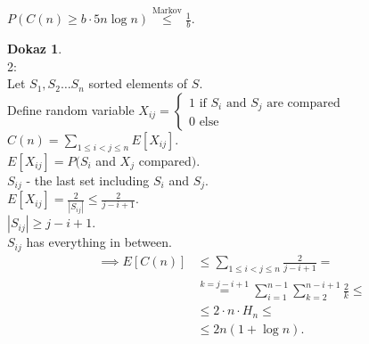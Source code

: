 \documentclass[a4paper, 12pt]{book}
\theoremstyle{definition}
\newtheorem{pro}[counter]{Dokaz}
\theoremstyle{remark}
\begin{document}
$P\left(C(n) \geq b \cdot 5n \log n\right) \stackrel{\text{Markov}}{\leq} \frac{1}{b}$.
\begin{pro} \text{} \\
  2: \\
  Let $S_1, S_2 \dots S_n$ sorted elements of $S$. \\
  Define random variable
  $X_{ij} = \begin{cases}
    1 \text{ if $S_i$ and $S_j$ are compared} \\
    0 \text{ else}
  \end{cases}$ \\
  $C(n) = \sum_{1 \leq i < j \leq n} E[X_{ij}]$. \\
  $E[X_{ij}] = P(S_i$ and $X_j$ compared$)$. \\
  $S_{ij}$ - the last set including $S_i$ and $S_j$. \\
  $E[X_{ij}] = \frac{2}{|S_{ij}|} \leq \frac{2}{j-i+1}$. \\
  $|S_{ij}| \geq j - i + 1$. \\
  $S_{ij}$ has everything in between. \\
  \begin{align*}
    \implies E[C(n)] &\leq \sum_{1 \leq i < j \leq n} \frac{2}{j-i+1} = \\
    &\stackrel{k=j-i+1}{=} \sum_{i=1}^{n-1} \sum_{k=2}^{n-i+1} \frac{2}{k} \leq \\
    &\leq 2 \cdot n \cdot H_n \leq \\
    &\leq 2 n (1 + \log n).
  \end{align*}
\end{pro}



\clearpage
{}





\clearpage
{}

\end{document}
